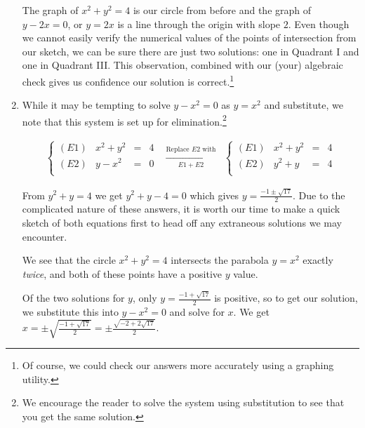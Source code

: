 \begin{ex}
\begin{enumerate}
The graph of  $x^2+y^2=4$ is our circle from before and the graph of $y - 2x =0$, or $y = 2x$ is a line through the origin with slope $2$.  Even though we cannot easily verify the numerical values of the points of intersection from our sketch, we can be sure there are just two solutions: one in Quadrant I and one in Quadrant III. This observation, combined with our (your) algebraic check gives us confidence our solution is correct.\footnote{Of course, we could check our answers more accurately using a graphing utility.}

\item  While it may be tempting to solve $y-x^2=0$ as $y=x^2$ and substitute, we note that this system is set up for elimination.\footnote{We encourage the reader to solve the system using substitution to see that you get the same solution.}  

\[ \begin{array}{ccc}

\left\{\begin{array}{lrcr} (E1) &  x^2 +y^2 & = & 4 \\ (E2) & y - x^2 & = & 0 \\ \end{array} \right.

&

\xrightarrow[\text{$E1 + E2$}]{\text{Replace $E2$ with}}

&

\left\{\begin{array}{lrcr} (E1) &  x^2 +y^2 & = & 4 \\ (E2) & y^2 +y  & = & 4 \\ \end{array} \right.

\end{array} \]

From $y^2 + y = 4$ we get $y^2+y-4 = 0$ which gives $y = \frac{-1 \pm \sqrt{17}}{2}$.  Due to the complicated nature of these answers, it is worth our time to make a quick sketch of both equations first to head off any extraneous solutions we may encounter.  

We see that the circle $x^2+y^2=4$ intersects the parabola $y=x^2$ exactly \textit{twice}, and both of these points have a positive $y$ value.  

Of the two solutions for $y$, only $y = \frac{-1 + \sqrt{17}}{2}$ is positive, so to get our solution, we substitute this into $y - x^2 = 0$ and solve for $x$.  We get $x = \pm \sqrt{\frac{-1 + \sqrt{17}}{2}} = \pm \frac{\sqrt{-2 + 2\sqrt{17}}}{2}$. 


\end{enumerate}
\end{ex}
